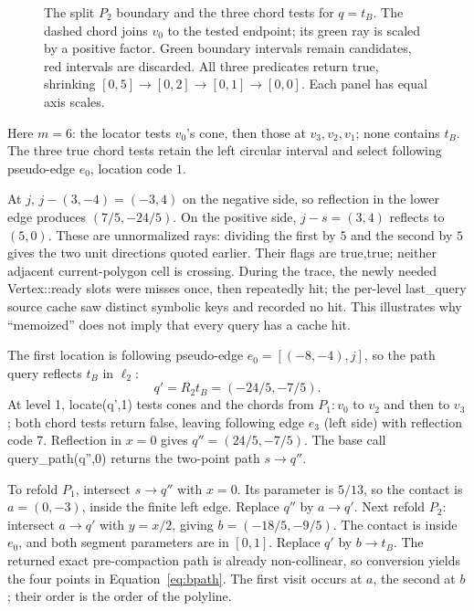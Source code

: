 \documentclass[12pt,a4paper]{article}
\newcommand{\code}[1]{{\ttfamily\color{codekw}#1}}
\begin{document}
\begin{figure}[htbp]\centering\figbinary\caption{The split \(P_2\) boundary and the three chord tests for \(q=t_B\). The dashed chord joins \(v_0\) to the tested endpoint; its green ray is scaled by a positive factor. Green boundary intervals remain candidates, red intervals are discarded. All three predicates return true, shrinking \([0,5]\to[0,2]\to[0,1]\to[0,0]\). Each panel has equal axis scales.}\label{fig:binary}\end{figure}

Here \(m=6\): the locator tests \(v_0\)'s cone, then those at \(v_3,v_2,v_1\); none contains \(t_B\). The three true chord tests retain the left circular interval and select following pseudo-edge \(e_0\), location code \(1\).

At \(j\), \(j-(3,-4)=(-3,4)\) on the negative side, so reflection in the lower edge produces \((7/5,-24/5)\). On the positive side, \(j-s=(3,4)\) reflects to \((5,0)\). These are unnormalized rays: dividing the first by \(5\) and the second by \(5\) gives the two unit directions quoted earlier. Their flags are \code{true,true}; neither adjacent current-polygon cell is crossing. During the trace, the newly needed \code{Vertex::ready} slots were misses once, then repeatedly hit; the per-level \code{last\_query} source cache saw distinct symbolic keys and recorded no hit. This illustrates why ``memoized'' does not imply that every query has a cache hit.

The first location is following pseudo-edge \(e_0=[(-8,-4),j]\), so the path query reflects \(t_B\) in \(\ell_2\):
\[
q'=R_2t_B=(-24/5,-7/5).
\]
At level 1, \code{locate(q',1)} tests cones and the chords from \(P_1:v_0\) to \(v_2\) and then to \(v_3\); both chord tests return false, leaving following edge \(e_3\) (left side) with reflection code \(7\). Reflection in \(x=0\) gives \(q''=(24/5,-7/5)\). The base call \code{query\_path(q'',0)} returns the two-point path \(s\to q''\).

To refold \(P_1\), intersect \(s\to q''\) with \(x=0\). Its parameter is \(5/13\), so the contact is \(a=(0,-3)\), inside the finite left edge. Replace \(q''\) by \(a\to q'\). Next refold \(P_2\): intersect \(a\to q'\) with \(y=x/2\), giving \(b=(-18/5,-9/5)\). The contact is inside \(e_0\), and both segment parameters are in \([0,1]\). Replace \(q'\) by \(b\to t_B\). The returned exact pre-compaction path is already non-collinear, so conversion yields the four points in Equation~\eqref{eq:bpath}. The first visit occurs at \(a\), the second at \(b\); their order is the order of the polyline.
\end{document}
